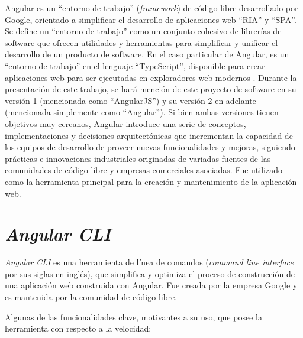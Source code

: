 Angular es un ``entorno de trabajo'' (\textit{framework}) de código libre desarrollado por Google, orientado a simplificar el desarrollo de aplicaciones web ``RIA'' y ``SPA''. Se define un ``entorno de trabajo'' como un conjunto cohesivo de librerías de software que ofrecen utilidades y herramientas para simplificar y unificar el desarrollo de un producto de software. En el caso particular de Angular, es un ``entorno de trabajo'' en el lenguaje ``TypeScript'', disponible para crear aplicaciones web para ser ejecutadas en exploradores web modernos \cite{angular}. Durante la presentación de este trabajo, se hará mención de este proyecto de software en su versión 1 (mencionada como ``AngularJS'') y su versión 2 en adelante (mencionada simplemente como ``Angular''). Si bien ambas versiones tienen objetivos muy cercanos, Angular introduce una serie de conceptos, implementaciones y decisiones arquitectónicas que incrementan la capacidad de los equipos de desarrollo de proveer nuevas funcionalidades y mejoras, siguiendo prácticas e innovaciones industriales originadas de variadas fuentes de las comunidades de código libre y empresas comerciales asociadas. Fue utilizado como la herramienta principal para la creación y mantenimiento de la aplicación web.

\section{\textit{Angular CLI}}

\textit{Angular CLI} es una herramienta de línea de comandos (\textit{command line interface} por sus siglas en inglés), que simplifica y optimiza el proceso de construcción de una aplicación web construida con Angular. Fue creada por la empresa Google y es mantenida por la comunidad de código libre.

Algunas de las funcionalidades clave, motivantes a su uso, que posee la herramienta con respecto a la velocidad:

